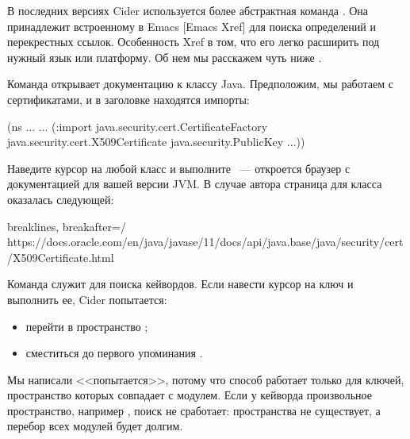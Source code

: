 В последних версиях Cider используется более абстрактная команда . Она принадлежит встроенному в Emacs [Emacs Xref] для поиска определений и перекрестных ссылок. Особенность Xref в том, что его легко расширить под нужный язык или платформу. Об нем мы расскажем чуть ниже .

Команда  открывает документацию к классу Java. Предположим, мы работаем с сертификатами, и в заголовке  находятся импорты:

\begin{english}
  \begin{clojure}
(ns ...
  ...
  (:import
   java.security.cert.CertificateFactory
   java.security.cert.X509Certificate
   java.security.PublicKey
   ...))
  \end{clojure}
\end{english}

Наведите курсор на любой класс и выполните ~--- откроется браузер с документацией для вашей версии JVM. В случае автора страница для класса  оказалась следующей:

\begin{english}
  \begin{text*}{breaklines, breakafter=/}
https://docs.oracle.com/en/java/javase/11/docs/api/java.base/java/security/cert/X509Certificate.html
  \end{text*}
\end{english}

Команда  служит для поиска кейвордов. Если навести курсор на ключ  и выполнить ее, Cider попытается:

\begin{itemize}

\item
  перейти в пространство ;

\item
  сместиться до первого упоминания .

\end{itemize}

Мы написали <<попытается>>, потому что способ работает только для ключей, пространство которых совпадает с модулем. Если у кейворда произвольное пространство, например , поиск не сработает: пространства  не существует, а перебор всех модулей будет долгим.

